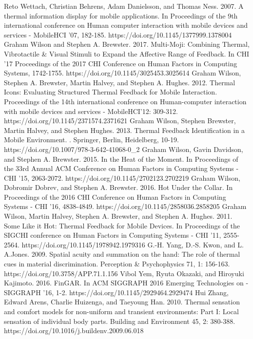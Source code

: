 \documentclass[preprint,12pt]{elsarticle}
\begin{document}
\begin{thebibliography}{00}
Reto Wettach, Christian Behrens, Adam Danielsson, and Thomas Ness. 2007. A thermal information display for mobile applications. In Proceedings of the 9th international conference on Human computer interaction with mobile devices and services - MobileHCI '07, 182-185. https://doi.org/10.1145/1377999.1378004
Graham Wilson and Stephen A. Brewster. 2017. Multi-Moji: Combining Thermal, Vibrotactile \& Visual Stimuli to Expand the Affective Range of Feedback. In CHI '17 Proceedings of the 2017 CHI Conference on Human Factors in Computing Systems, 1742-1755. https://doi.org/10.1145/3025453.3025614
Graham Wilson, Stephen A. Brewster, Martin Halvey, and Stephen A. Hughes. 2012. Thermal Icons: Evaluating Structured Thermal Feedback for Mobile Interaction. Proceedings of the 14th international conference on Human-computer interaction with mobile devices and services - MobileHCI'12: 309-312. https://doi.org/10.1145/2371574.2371621
Graham Wilson, Stephen Brewster, Martin Halvey, and Stephen Hughes. 2013. Thermal Feedback Identification in a Mobile Environment. . Springer, Berlin, Heidelberg, 10-19. https://doi.org/10.1007/978-3-642-41068-0\_2
Graham Wilson, Gavin Davidson, and Stephen A. Brewster. 2015. In the Heat of the Moment. In Proceedings of the 33rd Annual ACM Conference on Human Factors in Computing Systems - CHI '15, 2063-2072. https://doi.org/10.1145/2702123.2702219
Graham Wilson, Dobromir Dobrev, and Stephen A. Brewster. 2016. Hot Under the Collar. In Proceedings of the 2016 CHI Conference on Human Factors in Computing Systems - CHI '16, 4838-4849. https://doi.org/10.1145/2858036.2858205
Graham Wilson, Martin Halvey, Stephen A. Brewster, and Stephen A. Hughes. 2011. Some Like it Hot: Thermal Feedback for Mobile Devices. In Proceedings of the SIGCHI conference on Human Factors in Computing Systems - CHI '11, 2555-2564. https://doi.org/10.1145/1978942.1979316
G.-H. Yang, D.-S. Kwon, and L. A.Jones. 2009. Spatial acuity and summation on the hand: The role of thermal cues in material discrimination. Perception \& Psychophysics 71, 1: 156-163. https://doi.org/10.3758/APP.71.1.156
Vibol Yem, Ryuta Okazaki, and Hiroyuki Kajimoto. 2016. FinGAR. In ACM SIGGRAPH 2016 Emerging Technologies on - SIGGRAPH '16, 1-2. https://doi.org/10.1145/2929464.2929474
Hui Zhang, Edward Arens, Charlie Huizenga, and Taeyoung Han. 2010. Thermal sensation and comfort models for non-uniform and transient environments: Part I: Local sensation of individual body parts. Building and Environment 45, 2: 380-388. https://doi.org/10.1016/j.buildenv.2009.06.018


\end{thebibliography}
\end{document}
